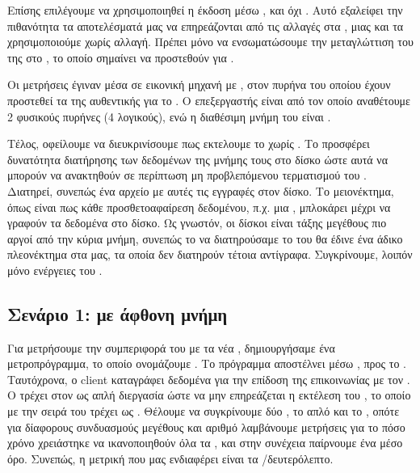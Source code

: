 Επίσης επιλέγουμε να χρησιμοποιηθεί η έκδοση  μέσω
, και όχι . Αυτό εξαλείφει
την πιθανότητα τα αποτελέσματά μας να επηρεάζονται από
τις αλλαγές στα , μιας και τα χρησιμοποιούμε
χωρίς αλλαγή. Πρέπει μόνο να ενσωματώσουμε την
μεταγλώττιση του της  στο , το οποίο
σημαίνει να προστεθούν  για .
\newline

Οι μετρήσεις έγιναν μέσα σε εικονική μηχανή 
με , στον πυρήνα του οποίου
έχουν προστεθεί τα  της αυθεντικής  για το
. Ο επεξεργαστής είναι  από τον οποίο
αναθέτουμε 2 φυσικούς πυρήνες (4 λογικούς), ενώ η
διαθέσιμη μνήμη  του  είναι .
\newline

Τέλος, οφείλουμε να διευκρινίσουμε πως εκτελουμε το
 χωρίς . Το  προσφέρει
δυνατότητα διατήρησης των δεδομένων της μνήμης τους
στο δίσκο ώστε αυτά να μπορούν να ανακτηθούν σε περίπτωση
μη προβλεπόμενου τερματισμού του . Διατηρεί,
συνεπώς ένα αρχείο με αυτές τις εγγραφές στον δίσκο.
Το μειονέκτημα, όπως είναι πως κάθε προσθετοαφαίρεση
δεδομένου, π.χ. μια , μπλοκάρει μέχρι να γραφούν τα
δεδομένα στο δίσκο\cite{redisAOF}. Ως γνωστόν, οι δίσκοι είναι τάξης
μεγέθους πιο αργοί από την κύρια μνήμη, συνεπώς το να
διατηρούσαμε το  του  θα έδινε ένα
άδικο πλεονέκτημα στα  μας, τα οποία δεν
διατηρούν τέτοια αντίγραφα. Συγκρίνουμε, λοιπόν μόνο
 ενέργειες του .



\subsection{Σενάριο 1: με άφθονη μνήμη}

Για μετρήσουμε την συμπεριφορά του  με τα νέα ,
δημιουργήσαμε ένα  μετροπρόγραμμα, το οποίο ονομάζουμε
. Το πρόγραμμα αποστέλνει μέσω ,
προς το . Ταυτόχρονα, ο client καταγράφει δεδομένα για την επίδοση
της επικοινωνίας με τον . O  τρέχει στον  ως απλή διεργασία
ώστε να μην επηρεάζεται η εκτέλεση του , το οποίο
με την σειρά του τρέχει ως . Θέλουμε να συγκρίνουμε
δύο , το απλό  και το , οπότε για δίαφορους
συνδυασμούς μεγέθους  και αριθμό  λαμβάνουμε
μετρήσεις για το πόσο χρόνο χρειάστηκε να ικανοποιηθούν όλα
τα , και στην συνέχεια παίρνουμε ένα μέσο όρο.
Συνεπώς, η μετρική που μας ενδιαφέρει είναι τα /δευτερόλεπτο.
\newline

